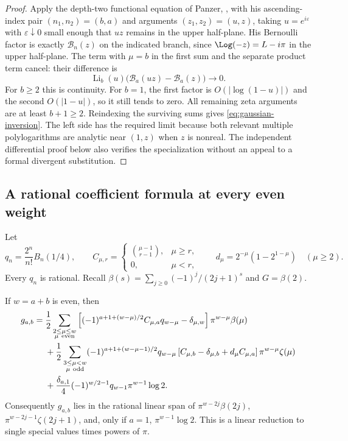 \begin{proof}
Apply the depth-two functional equation of Panzer,
\cite[Eq.~(3.2)]{Panzer2017}, with his ascending-index pair $(n_1,n_2)=(b,a)$
and arguments $(z_1,z_2)=(u,z)$, taking $u=e^{i\varepsilon}$ with
$\varepsilon\downarrow0$ small enough that $uz$ remains in the upper
half-plane. His Bernoulli factor
is exactly $\mathcal B_n(z)$ on the indicated branch, since
$\Log(-z)=L-i\pi$ in the upper half-plane. The term with $\mu=b$ in
the first sum and the separate product term cancel: their difference is
\[
 \operatorname{Li}_b(u)
 \bigl(\mathcal B_a(uz)-\mathcal B_a(z)\bigr)\longrightarrow0.
\]
For $b\ge2$ this is continuity. For $b=1$, the first factor is
$O(|\log(1-u)|)$ and the second $O(|1-u|)$, so it still tends to zero.
All remaining zeta arguments are at least $b+1\ge2$.
Reindexing the surviving sums gives \eqref{eq:gaussian-inversion}.
The left side has the required limit because both relevant multiple
polylogarithms are analytic near $(1,z)$ when $z$ is nonreal. The
independent differential proof below also verifies the specialization
without an appeal to a formal divergent substitution.
\end{proof}

\subsection{A rational coefficient formula at every even weight}

Let
\[
 q_n=\frac{2^n}{n!}B_n(1/4),\qquad
 C_{\mu,r}=\begin{cases}\binom{\mu-1}{r-1},&\mu\ge r,\\0,&\mu<r,
 \end{cases}
 \qquad d_\mu=2^{-\mu}(1-2^{1-\mu})\quad(\mu\ge2).
\]
Every $q_n$ is rational. Recall $\beta(s)=\sum_{j\ge0}(-1)^j/(2j+1)^s$
and $G=\beta(2)$.

\begin{corollary}
\label{cor:gaussian-coefficient-rule}
If $w=a+b$ is even, then
\begin{align}
 g_{a,b}={}&\frac12\sum_{\substack{2\le\mu\le w\\\mu\ \mathrm{even}}}
 \left[(-1)^{a+1+(w-\mu)/2}C_{\mu,a}q_{w-\mu}
       -\delta_{\mu,w}\right]\pi^{w-\mu}\beta(\mu)
 \label{eq:gaussian-real-coefficients}\\
 &+\frac12\sum_{\substack{3\le\mu<w\\\mu\ \mathrm{odd}}}
 (-1)^{a+1+(w-\mu-1)/2}q_{w-\mu}
 \left[C_{\mu,b}-\delta_{\mu,b}+d_\mu C_{\mu,a}\right]
 \pi^{w-\mu}\zeta(\mu)\notag\\
 &+\frac{\delta_{a,1}}4(-1)^{w/2-1}q_{w-1}\pi^{w-1}\log2.\notag
\end{align}
Consequently $g_{a,b}$ lies in the rational linear span of
$\pi^{w-2j}\beta(2j)$, $\pi^{w-2j-1}\zeta(2j+1)$, and, only if $a=1$,
$\pi^{w-1}\log2$. This is a linear reduction to single special values
times powers of $\pi$.
\end{corollary}

